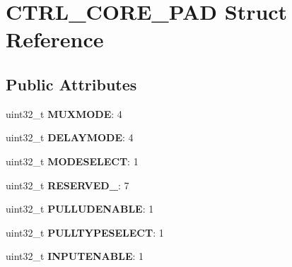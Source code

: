 \hypertarget{structCTRL__CORE__PAD}{\section{C\-T\-R\-L\-\_\-\-C\-O\-R\-E\-\_\-\-P\-A\-D Struct Reference}
\label{structCTRL__CORE__PAD}
}
\subsection*{Public Attributes}
\begin{DoxyCompactItemize}
\item 
\hypertarget{structCTRL__CORE__PAD_a127657e51afce06dac9ad12e2fc67c17}{uint32\-\_\-t {\bfseries M\-U\-X\-M\-O\-D\-E}\-: 4}\label{structCTRL__CORE__PAD_a127657e51afce06dac9ad12e2fc67c17}

\item 
\hypertarget{structCTRL__CORE__PAD_ac9a109249b221249f59905d3f1123e56}{uint32\-\_\-t {\bfseries D\-E\-L\-A\-Y\-M\-O\-D\-E}\-: 4}\label{structCTRL__CORE__PAD_ac9a109249b221249f59905d3f1123e56}

\item 
\hypertarget{structCTRL__CORE__PAD_abf1b972d6f3cebf3a558b4059a46fd3e}{uint32\-\_\-t {\bfseries M\-O\-D\-E\-S\-E\-L\-E\-C\-T}\-: 1}\label{structCTRL__CORE__PAD_abf1b972d6f3cebf3a558b4059a46fd3e}

\item 
\hypertarget{structCTRL__CORE__PAD_af2708d097f956af36e10be5df508454d}{uint32\-\_\-t {\bfseries R\-E\-S\-E\-R\-V\-E\-D\-\_}\-: 7}\label{structCTRL__CORE__PAD_af2708d097f956af36e10be5df508454d}

\item 
\hypertarget{structCTRL__CORE__PAD_a446ebeadbe92eae6a2fc729b024d4ef9}{uint32\-\_\-t {\bfseries P\-U\-L\-L\-U\-D\-E\-N\-A\-B\-L\-E}\-: 1}\label{structCTRL__CORE__PAD_a446ebeadbe92eae6a2fc729b024d4ef9}

\item 
\hypertarget{structCTRL__CORE__PAD_af4e5a2ad2239efe786125d237dc35b4c}{uint32\-\_\-t {\bfseries P\-U\-L\-L\-T\-Y\-P\-E\-S\-E\-L\-E\-C\-T}\-: 1}\label{structCTRL__CORE__PAD_af4e5a2ad2239efe786125d237dc35b4c}

\item 
\hypertarget{structCTRL__CORE__PAD_a51fcc4d63d87f99fdbad66c3f7f74844}{uint32\-\_\-t {\bfseries I\-N\-P\-U\-T\-E\-N\-A\-B\-L\-E}\-: 1}\label{structCTRL__CORE__PAD_a51fcc4d63d87f99fdbad66c3f7f74844}


\end{DoxyCompactItemize}
